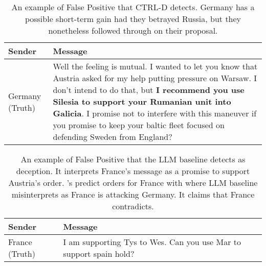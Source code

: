 \begin{table}[t]
    \begin{tabular}{p{1.2cm}p{5.5cm}}
    \hline
    \textbf{Sender} & \textbf{Message}   \\ 
    \hline
     \rowcolor{grayish} Germany (Truth) & \small{Well the feeling is mutual. I wanted to let you know that Austria asked for my help putting pressure on Warsaw. I don't intend to do that, but \textbf{I recommend you use Silesia to support your Rumanian unit into Galicia}. I promise not to interfere with this maneuver if you promise to keep your baltic fleet focused on defending Sweden from England?} \\ 
  \hline
    \end{tabular}
    \caption{An example of False Positive that  CTRL-D detects. Germany has a possible short-term gain had they betrayed Russia, but they nonetheless followed through on their proposal.
    }
    \label{tab:fp_cfrl}
\end{table}

\begin{table}[t]
    \begin{tabular}{p{1.2cm}p{5.5cm}}
    \hline
    \textbf{Sender} & \textbf{Message}   \\ 
    \hline
     \rowcolor{grayish} France (Truth) & \small{I am supporting Tys to Wes. Can you use Mar to support spain hold?} \\ 
  \hline
    \end{tabular}
    \caption{An example of False Positive that the LLM baseline detects as deception. It interprets France's message as a promise to support Austria's order. \cicero{}'s predict orders for France with  where LLM baseline misinterprets as France is attacking Germany. It claims that France contradicts.}
    \label{tab:fp_llama3}
\end{table}
